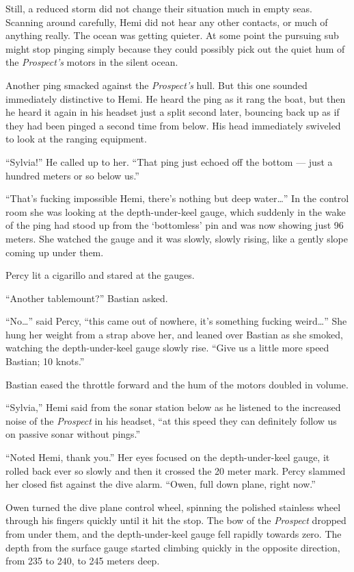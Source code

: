 \documentclass[
]{scrbook}
\begin{document}
Still, a reduced storm did not change their situation much in empty
seas. Scanning around carefully, Hemi did not hear any other contacts,
or much of anything really. The ocean was getting quieter. At some point
the pursuing sub might stop pinging simply because they could possibly
pick out the quiet hum of the \emph{Prospect's} motors in the silent
ocean.

Another ping smacked against the \emph{Prospect's} hull. But this one
sounded immediately distinctive to Hemi. He heard the ping as it rang
the boat, but then he heard it again in his headset just a split second
later, bouncing back up as if they had been pinged a second time from
below. His head immediately swiveled to look at the ranging equipment.

``Sylvia!'' He called up to her. ``That ping just echoed off the bottom
--- just a hundred meters or so below us.''

``That's fucking impossible Hemi, there's nothing but deep
water\ldots{}'' In the control room she was looking at the
depth-under-keel gauge, which suddenly in the wake of the ping had stood
up from the `bottomless' pin and was now showing just 96 meters. She
watched the gauge and it was slowly, slowly rising, like a gently slope
coming up under them.

Percy lit a cigarillo and stared at the gauges.

``Another tablemount?'' Bastian asked.

``No\ldots{}'' said Percy, ``this came out of nowhere, it's something
fucking weird\ldots{}'' She hung her weight from a strap above her, and
leaned over Bastian as she smoked, watching the depth-under-keel gauge
slowly rise. ``Give us a little more speed Bastian; 10 knots.''

Bastian eased the throttle forward and the hum of the motors doubled in
volume.

``Sylvia,'' Hemi said from the sonar station below as he listened to the
increased noise of the \emph{Prospect} in his headset, ``at this speed
they can definitely follow us on passive sonar without pings.''

``Noted Hemi, thank you.'' Her eyes focused on the depth-under-keel
gauge, it rolled back ever so slowly and then it crossed the 20 meter
mark. Percy slammed her closed fist against the dive alarm. ``Owen, full
down plane, right now.''

Owen turned the dive plane control wheel, spinning the polished
stainless wheel through his fingers quickly until it hit the stop. The
bow of the \emph{Prospect} dropped from under them, and the
depth-under-keel gauge fell rapidly towards zero. The depth from the
surface gauge started climbing quickly in the opposite direction, from
235 to 240, to 245 meters deep.
\end{document}
